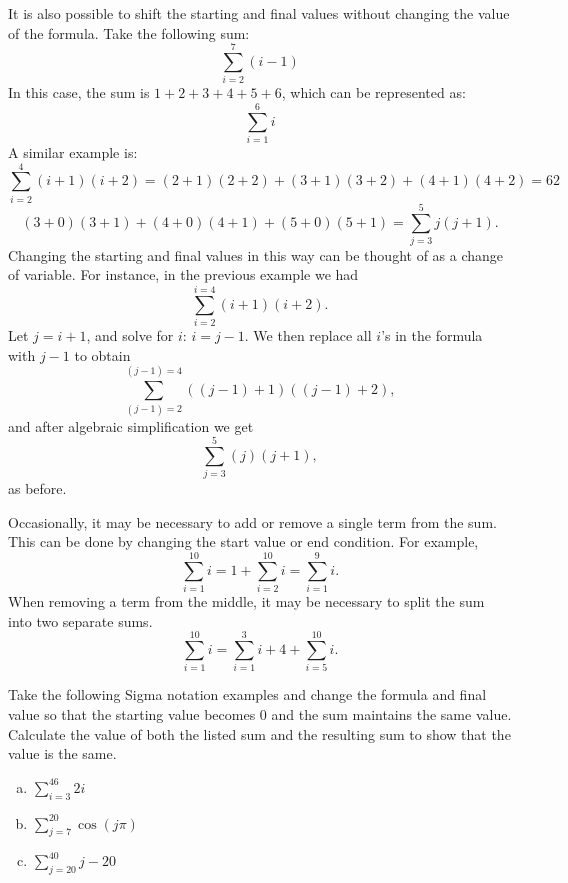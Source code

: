 It is also possible to shift 
the starting and final values without changing the value of the formula. Take the following sum:
\[\sum_{i=2}^{7}(i-1)\] 
In this case, the sum is
$1+2+3+4+5+6$, which can be represented as:
\[\sum_{i=1}^{6}i\] 
A similar example is:
\[\sum_{i=2}^{4}(i+1)(i+2)=(2+1)(2+2) + (3+1)(3+2)+(4+1)(4+2) = 62\]
 \[(3+0)(3+1) + (4+0)(4+1)+(5+0)(5+1) = \sum_{j=3}^{5}j(j+1).\] 
Changing the starting and final values in this way can be thought of as a change of variable. For instance, in the previous example we had
\[\sum_{i=2}^{i=4}(i+1)(i+2).\]
Let $j = i+1$, and solve for $i$: $i = j-1$. We then replace all $i$'s in the formula with $j-1$ to obtain
\[\sum_{(j-1)=2}^{(j-1)=4}((j-1)+1)((j-1)+2),\]
and after algebraic simplification we get
\[\sum_{j=3}^{5}(j)(j+1),\]
as before.

Occasionally, it may be necessary to add or remove a single term from the sum.  This can be done by changing the start value or end condition. For example,
\[\sum_{i=1}^{10}i = 1 + \sum_{i=2}^{10} i = \sum_{i=1}^9 i.\]
When removing a term from the middle, it may be necessary to split the sum into two separate sums.
\[\sum_{i=1}^{10}i = \sum_{i=1}^{3}i + 4 + \sum_{i=5}^{10}i.\]

\begin {exercise}{}
Take the following Sigma notation examples and change the formula and final value so that the starting value becomes 0 and the sum maintains the same value.  Calculate the value of both the listed sum and the resulting sum to show that the value is the same.
\begin {enumerate} [(a)]
 \item
$\sum_{i=3}^{46}2i$
\item
$\sum_{j=7}^{20}\cos(j\pi )$
\item
$\sum_{j=20}^{40}j-20$
\end {enumerate}
\end{exercise}

